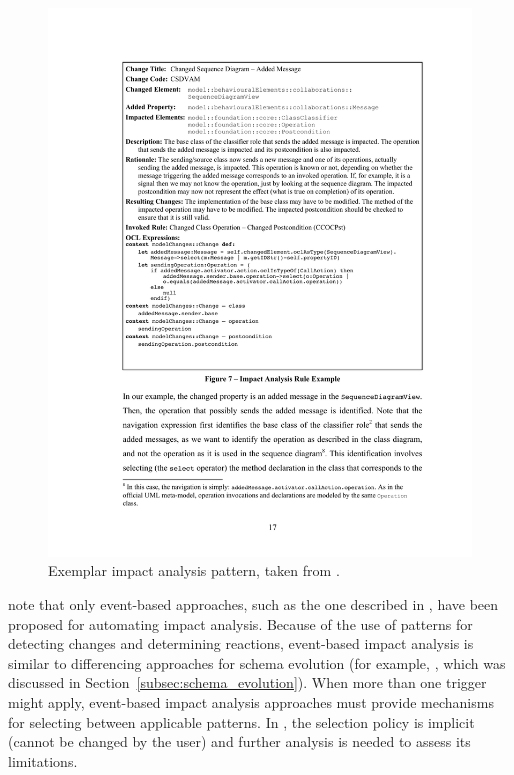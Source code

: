 \begin{figure}[htbp]
  \begin{center}
    \leavevmode
    \includegraphics[width=12cm]{3.LiteratureReview/images/impact_analysis_pattern.pdf}
  \end{center}
  \caption[Exemplar impact analysis pattern]{Exemplar impact analysis pattern, taken from \cite{briand03impactanalysis}.}
  \label{fig:impact_analysis_pattern}
\end{figure}

\cite{winkler09survey} note that only event-based approaches, such as the one described in \cite{briand03impactanalysis}, have been proposed for automating impact analysis. Because of the use of patterns for detecting changes and determining reactions, event-based impact analysis is similar to differencing approaches for schema evolution (for example, \cite{lerner00model}, which was discussed in Section~\ref{subsec:schema_evolution}). When more than one trigger might apply, event-based impact analysis approaches must provide mechanisms for selecting between applicable patterns. In \cite{briand03impactanalysis}, the selection policy is implicit (cannot be changed by the user) and further analysis is needed to assess its limitations.


